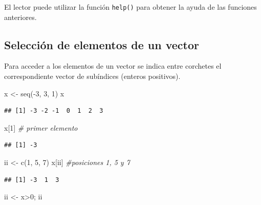 \documentclass[
]{book}
\newenvironment{Shaded}{\begin{snugshade}}{\end{snugshade}}
\newcommand{\CommentTok}[1]{\textcolor[rgb]{0.56,0.35,0.01}{\textit{#1}}}
\newcommand{\DecValTok}[1]{\textcolor[rgb]{0.00,0.00,0.81}{#1}}
\newcommand{\FunctionTok}[1]{\textcolor[rgb]{0.00,0.00,0.00}{#1}}
\newcommand{\NormalTok}[1]{#1}
\newcommand{\OtherTok}[1]{\textcolor[rgb]{0.56,0.35,0.01}{#1}}
\newcommand{\SpecialCharTok}[1]{\textcolor[rgb]{0.00,0.00,0.00}{#1}}
\theoremstyle{break}
\begin{document}
El lector puede utilizar la función \texttt{help()} para obtener la ayuda de las funciones
anteriores.

\hypertarget{selecciuxf3n-de-elementos-de-un-vector}{%
\subsection{Selección de elementos de un vector}\label{selecciuxf3n-de-elementos-de-un-vector}}

Para acceder a los elementos de un vector se indica entre corchetes el
correspondiente vector de subíndices (enteros positivos).

\begin{Shaded}
\begin{Highlighting}[]
\NormalTok{x }\OtherTok{\textless{}{-}} \FunctionTok{seq}\NormalTok{(}\SpecialCharTok{{-}}\DecValTok{3}\NormalTok{, }\DecValTok{3}\NormalTok{, }\DecValTok{1}\NormalTok{)}
\NormalTok{x}
\end{Highlighting}
\end{Shaded}

\begin{verbatim}
## [1] -3 -2 -1  0  1  2  3
\end{verbatim}

\begin{Shaded}
\begin{Highlighting}[]
\NormalTok{x[}\DecValTok{1}\NormalTok{] }\CommentTok{\# primer elemento}
\end{Highlighting}
\end{Shaded}

\begin{verbatim}
## [1] -3
\end{verbatim}

\begin{Shaded}
\begin{Highlighting}[]
\NormalTok{ii }\OtherTok{\textless{}{-}} \FunctionTok{c}\NormalTok{(}\DecValTok{1}\NormalTok{, }\DecValTok{5}\NormalTok{, }\DecValTok{7}\NormalTok{)}
\NormalTok{x[ii] }\CommentTok{\#posiciones 1, 5 y 7}
\end{Highlighting}
\end{Shaded}

\begin{verbatim}
## [1] -3  1  3
\end{verbatim}

\begin{Shaded}
\begin{Highlighting}[]
\NormalTok{ii }\OtherTok{\textless{}{-}}\NormalTok{ x}\SpecialCharTok{\textgreater{}}\DecValTok{0}\NormalTok{; ii}
\end{Highlighting}
\end{Shaded}
\end{document}
